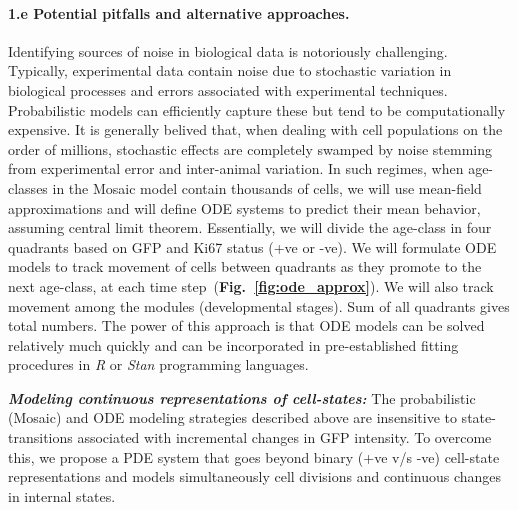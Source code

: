 \documentclass[11pt]{article}
\newcommand{\para}[1]{\vspace*{-4.5mm}\paragraph{#1}}
\begin{document}
\para{1.e Potential pitfalls and alternative approaches.}
Identifying sources of noise in biological data is notoriously challenging.
Typically, experimental data contain noise due to stochastic variation in biological processes and errors associated with experimental techniques.
Probabilistic models can efficiently capture these but tend to be computationally expensive.
It is generally belived that, when dealing with cell populations on the order of millions, stochastic effects are completely swamped by noise stemming from experimental error and inter-animal variation.
In such regimes, when age-classes in the Mosaic model contain thousands of cells, we will use mean-field approximations and will define ODE systems to predict their mean behavior, assuming central limit theorem. 
Essentially, we will divide the age-class in four quadrants based on GFP and Ki67 status (+ve or -ve). %
We will formulate ODE models to track movement of cells between quadrants as they promote to the next age-class, at each time step~(\textbf{Fig.~\ref{fig:ode_approx}}).
We will also track movement among the modules (developmental stages).
Sum of all quadrants gives total numbers. %
The power of this approach is that ODE models can be solved relatively much quickly and can be incorporated in pre-established fitting procedures in \textit{R} or \textit{Stan} programming languages.

\textbf{\textit{Modeling continuous representations of cell-states:}}
The probabilistic (Mosaic) and ODE modeling strategies described above %
are insensitive to state-transitions associated with incremental changes in GFP intensity. 
To overcome this, we propose a PDE system that goes beyond binary (+ve v/s -ve) cell-state representations and models simultaneously cell divisions and continuous changes in internal states.
\end{document}
